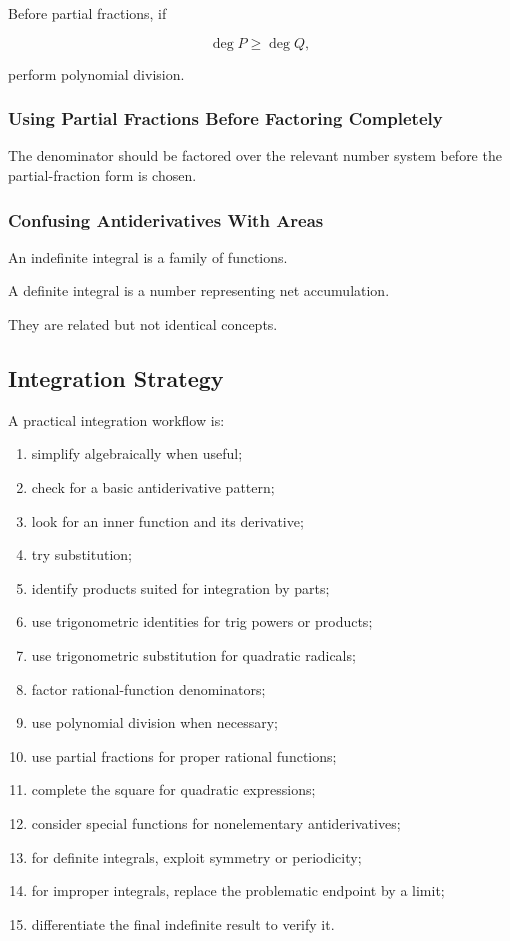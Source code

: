 Before partial fractions, if

\[
\deg P
\geq
\deg Q,
\]

perform polynomial division.

\subsubsection{Using Partial Fractions Before Factoring Completely}

The denominator should be factored over the relevant number system before the
partial-fraction form is chosen.

\subsubsection{Confusing Antiderivatives With Areas}

An indefinite integral is a family of functions.

A definite integral is a number representing net accumulation.

They are related but not identical concepts.

\subsection{Integration Strategy}
\label{subsec:integration-strategy-reference}

A practical integration workflow is:

\begin{enumerate}
    \item simplify algebraically when useful;
    \item check for a basic antiderivative pattern;
    \item look for an inner function and its derivative;
    \item try substitution;
    \item identify products suited for integration by parts;
    \item use trigonometric identities for trig powers or products;
    \item use trigonometric substitution for quadratic radicals;
    \item factor rational-function denominators;
    \item use polynomial division when necessary;
    \item use partial fractions for proper rational functions;
    \item complete the square for quadratic expressions;
    \item consider special functions for nonelementary antiderivatives;
    \item for definite integrals, exploit symmetry or periodicity;
    \item for improper integrals, replace the problematic endpoint by a limit;
    \item differentiate the final indefinite result to verify it.
\end{enumerate}

